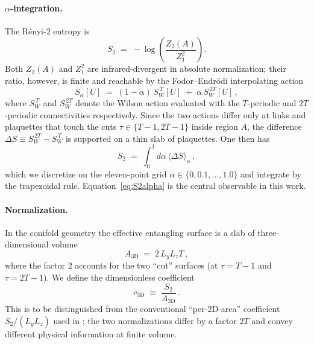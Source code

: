\documentclass[aps,prl,reprint,superscriptaddress,floatfix,nofootinbib,amssymb]{revtex4-2}
\begin{document}
\paragraph{$\alpha$-integration.}
The R\'enyi-$2$ entropy is
\begin{equation}
S_2 \;=\; -\log\!\left( \frac{Z_2(A)}{Z_1^{2}}\right).
\label{eq:S2def}
\end{equation}
Both $Z_2(A)$ and $Z_1^{2}$ are infrared-divergent in absolute normalization; their ratio, however, is finite and reachable by the Fodor--Endr\H{o}di interpolating action \cite{BP2008b}
\begin{equation}
S_\alpha[U] \;=\; (1-\alpha)\,S_W^{\,T}[U] \;+\; \alpha\, S_W^{\,2T}[U]\,,
\label{eq:Salpha}
\end{equation}
where $S_W^{\,T}$ and $S_W^{\,2T}$ denote the Wilson action evaluated with the $T$-periodic and $2T$-periodic connectivities respectively. Since the two actions differ only at links and plaquettes that touch the cuts $\tau \in\{T\!-\!1, 2T\!-\!1\}$ inside region $A$, the difference $\Delta S \equiv S_W^{\,2T} - S_W^{\,T}$ is supported on a thin slab of plaquettes. One then has
\begin{equation}
S_2 \;=\; \int_0^1 d\alpha \, \langle \Delta S \rangle_\alpha\,,
\label{eq:S2alpha}
\end{equation}
which we discretize on the eleven-point grid $\alpha\in\{0,0.1,\dots,1.0\}$ and integrate by the trapezoidal rule. Equation~\eqref{eq:S2alpha} is the central observable in this work.

\paragraph{Normalization.}
In the conifold geometry the effective entangling surface is a slab of three-dimensional volume
\begin{equation}
A_{3\text{D}} \;=\; 2\, L_y L_z T\,,
\label{eq:A3D}
\end{equation}
where the factor $2$ accounts for the two ``cut'' surfaces (at $\tau=T-1$ and $\tau=2T-1$). We define the dimensionless coefficient
\begin{equation}
c_{3\text{D}} \;\equiv\; \frac{S_2}{A_{3\text{D}}}\,.
\label{eq:c3D}
\end{equation}
This is to be distinguished from the conventional ``per-2D-area'' coefficient $S_2/(L_y L_z)$ used in \cite{Rabenstein2019}; the two normalizations differ by a factor $2T$ and convey different physical information at finite volume.
\end{document}
